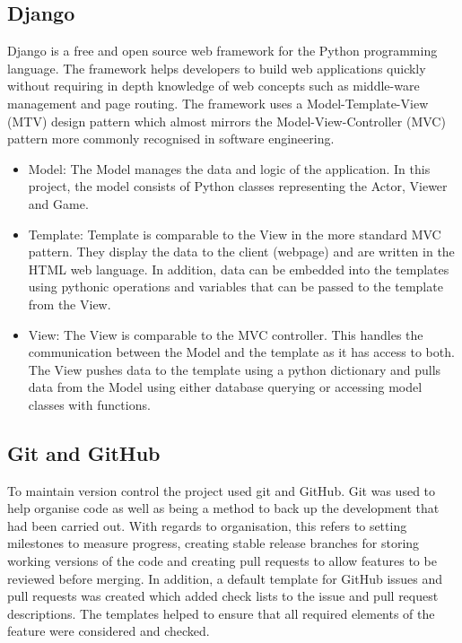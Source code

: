 \subsection{Django}
Django is a free and open source web framework for the Python programming language. The framework helps developers to build web applications quickly without requiring in depth knowledge of web concepts such as middle-ware management and page routing. The framework uses a Model-Template-View (MTV) design pattern which almost mirrors the Model-View-Controller (MVC) pattern more commonly recognised in software engineering. 
\begin{itemize}
	\item Model: The Model manages the data and logic of the application. In this project, the model consists of Python classes representing the Actor, Viewer and Game.
	
	\item Template: Template is comparable to the View in the more standard MVC pattern. They display the data to the client (webpage) and are written in the HTML web language.  In addition, data can be embedded into the templates using pythonic operations and variables that can be passed to the template from the View. 
	
	\item View: The View is comparable to the MVC controller. This handles the communication between the Model and the template as it has access to both. The View pushes data to the template using a python dictionary and pulls data from the Model using either database querying or accessing model classes with functions.
	
\end{itemize}

\subsection{Git and GitHub}
To maintain version control the project used git and GitHub. Git was used to help organise code as well as being a method to back up the development that had been carried out. With regards to organisation, this refers to setting milestones to measure progress, creating stable release branches for storing working versions of the code and creating pull requests to allow features to be reviewed before merging. In addition, a default template for GitHub issues and pull requests was created which added check lists to the issue and pull request descriptions. The templates helped to ensure that all required elements of the feature were considered and checked.

